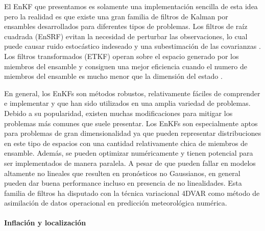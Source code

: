 El EnKF que presentamos es solamente una implementación sencilla de esta idea pero la realidad es que existe una gran familia de filtros de Kalman por ensambles desarrollados para diferentes tipos de problemas. Los filtros de raíz cuadrada (EnSRF) evitan la necesidad de perturbar las observaciones, lo cual puede causar ruido estocástico indeseado y una subestimación de las covarianzas \citep{Whitaker2002, Anderson2001}. Los filtros transformados (ETKF) operan sobre el espacio generado por los miembros del ensamble y consiguen una mejor eficiencia cuando el numero de miembros del ensamble es mucho menor que la dimensión del estado \citep{Bishop2001}.

En general, los EnKFs son métodos robustos, relativamente fáciles de comprender e implementar y que han sido utilizados en una amplia variedad de problemas. Debido a su popularidad, existen muchas modificaciones para mitigar los problemas más comunes que suele presentar. Los EnKFs son especialmente aptos para problemas de gran dimensionalidad ya que pueden representar distribuciones en este tipo de espacios con una cantidad relativamente chica de miembros de ensamble. Además, se pueden optimizar numéricamente y tienen potencial para ser implementados de manera paralela. A pesar de que pueden fallar en modelos altamente no lineales que resulten en pronósticos no Gaussianos, en general pueden dar buena performance incluso en presencia de no linealidades. Esta familia de filtros ha disputado con la técnica variacional 4DVAR como método de asimilación de datos operacional en predicción meteorológica numérica.

\paragraph{Inflación y localización} \

